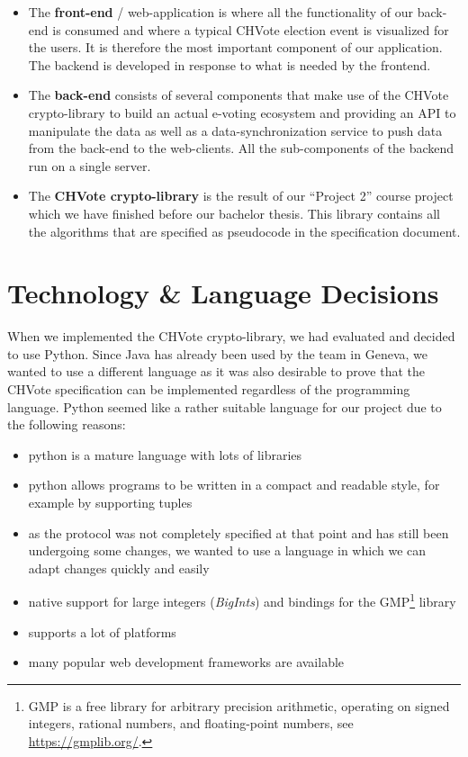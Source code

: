 \begin{itemize}
	\item The \textbf{front-end} / web-application is where all the functionality of our back-end is consumed and where a typical CHVote election event is visualized for the users. It is therefore the most important component of our application. The backend is developed in response to what is needed by the frontend.
	\item The \textbf{back-end} consists of several components that make use of the CHVote crypto-library to build an actual e-voting ecosystem and providing an API to manipulate the data as well as a data-synchronization service to push data from the back-end to the web-clients. All the sub-components of the backend run on a single server.
	\item The \textbf{CHVote crypto-library} is the result of our "`Project 2"' course project which we have finished before our bachelor thesis. This library contains all the algorithms that are specified as pseudocode in the specification document.
\end{itemize}

\section{Technology \& Language Decisions}
When we implemented the CHVote crypto-library, we had evaluated and decided to use Python. Since Java has already been used by the team in Geneva, we wanted to use a different language as it was also desirable to prove that the CHVote specification can be implemented regardless of the programming language. Python seemed like a rather suitable language for our project due to the following reasons:
\begin{itemize}
	\item python is a mature language with lots of libraries
	\item python allows programs to be written in a compact and readable style, for example by supporting tuples
	\item as the protocol was not completely specified at that point and has still been undergoing some changes, we wanted to use a language in which we can adapt changes quickly and easily
	\item native support for large integers (\textit{BigInts}) and bindings for the GMP\footnote{GMP is a free library for arbitrary precision arithmetic, operating on signed integers, rational numbers, and floating-point numbers, see \url{https://gmplib.org/}.} library
	\item supports a lot of platforms
	\item many popular web development frameworks are available
\end{itemize}

